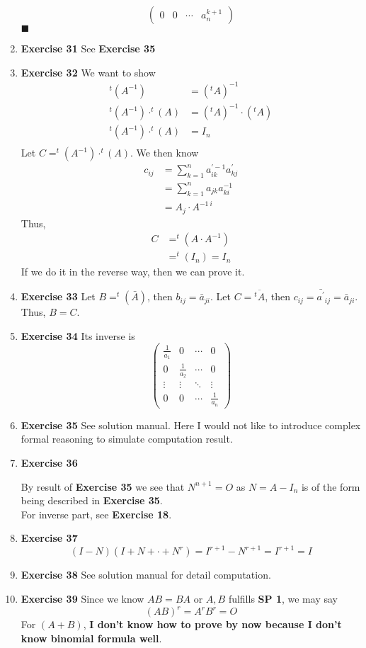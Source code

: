 \documentclass[11pt]{article}
\begin{document}
\begin{enumerate}
$$\begin{pmatrix}
0 & 0 & \cdots & a_n^{k+1}
\end{pmatrix}$$
\(\blacksquare\)
\item \textbf{Exercise 31}
\label{sec:org12a49ec}
See \textbf{Exercise 35}
\item \textbf{Exercise 32}
\label{sec:org72452cf}
We want to show
$$\begin{aligned}
^t(A^{-1})&=(^t A)^{-1}\\
^t(A^{-1})\cdot ^t (A)&=(^t A)^{-1} \cdot (^tA)\\
^t(A^{-1})\cdot ^t (A)&=I_n\\
\end{aligned}$$
Let \(C=^t(A^{-1})\cdot ^t (A)\). We then know
$$\begin{aligned}
c_{ij}&=\sum\limits_{k=1}^n a^{\prime -1}_{ik} a^{\prime}_{kj}\\
&=\sum\limits_{k=1}^n a_{jk} a^{-1}_{ki}\\
&=A_j\cdot A^{-1\ i}
\end{aligned}$$
Thus,
$$\begin{aligned}
C&=^t(A\cdot A^{-1})\\
&=^t(I_n)=I_n
\end{aligned}$$
If we do it in the reverse way, then we can prove it.
\item \textbf{Exercise 33}
\label{sec:orgccb4993}
Let \(B=^t (\bar{A})\), then \(b_{ij}=\bar{a}_{ji}\). Let \(C=\overline{^t A}\), then \(c_{ij}=\bar{a^{\prime}}_{ij}=\bar{a}_{ji}\). Thus, \(B=C\).
\item \textbf{Exercise 34}
\label{sec:org100615e}
Its inverse is
$$\begin{pmatrix}
\frac{1}{a_1} & 0 & \cdots & 0\\
0 & \frac{1}{a_2} & \cdots & 0\\
\vdots & \vdots & \ddots & \vdots \\
0 & 0 & \cdots & \frac{1}{a_n}
\end{pmatrix}$$
\item \textbf{Exercise 35}
\label{sec:org8b9083e}
See solution manual. Here I would not like to introduce complex formal reasoning to simulate computation result.
\item \textbf{Exercise 36}
\label{sec:org0697bd9}

By result of \textbf{Exercise 35} we see that \(N^{n+1}=O\) as \(N=A-I_n\) is of the form being described in \textbf{Exercise 35}.\\
For inverse part, see \textbf{Exercise 18}.
\item \textbf{Exercise 37}
\label{sec:org2c35ba7}
$$(I-N)(I+N+\cdot +N^r)=I^{r+1}-N^{r+1}=I^{r+1}=I$$
\item \textbf{Exercise 38}
\label{sec:orgb1ae627}
See solution manual for detail computation.
\item \textbf{Exercise 39}
\label{sec:org8ca03c9}
Since we know \(AB=BA\) or \(A,B\) fulfills \textbf{SP 1}, we may say
$$(AB)^r=A^rB^r=O$$
For \((A+B)\), \textbf{I don't know how to prove by now because I don't know binomial formula well}.
\end{enumerate}
\end{document}
